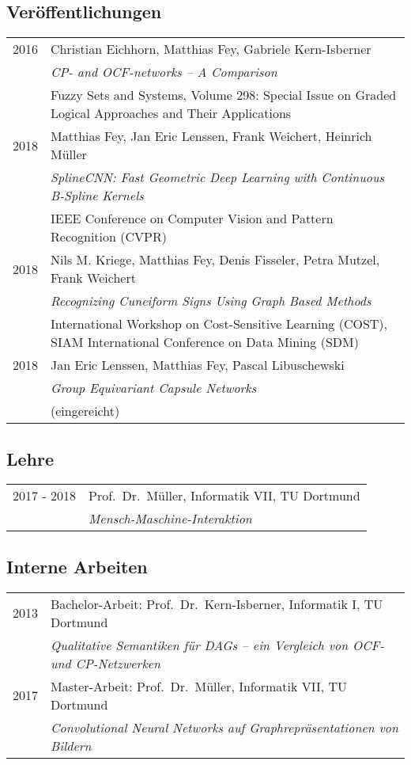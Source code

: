 \documentclass[10pt]{scrartcl}
\begin{document}
\subsection*{Veröffentlichungen}

\begin{tabular}{p{3cm}p{13cm}}
2016 & Christian Eichhorn, Matthias Fey, Gabriele Kern-Isberner\\
     & \textit{CP- and OCF-networks – A Comparison}\\
     & Fuzzy Sets and Systems, Volume 298: Special Issue on Graded Logical Approaches and Their Applications\\
2018 & Matthias Fey, Jan Eric Lenssen, Frank Weichert, Heinrich Müller\\
     & \textit{SplineCNN: Fast Geometric Deep Learning with Continuous B-Spline Kernels}\\
     & IEEE Conference on Computer Vision and Pattern Recognition (CVPR)\\
2018 & Nils M. Kriege, Matthias Fey, Denis Fisseler, Petra Mutzel, Frank Weichert\\
     & \textit{Recognizing Cuneiform Signs Using Graph Based Methods}\\
     & International Workshop on Cost-Sensitive Learning (COST), SIAM International Conference on Data Mining (SDM)\\
2018 & Jan Eric Lenssen, Matthias Fey, Pascal Libuschewski\\
     & \textit{Group Equivariant Capsule Networks}\\
     & (eingereicht)\\
\end{tabular}

\subsection*{Lehre}

\begin{tabular}{p{3cm}p{13cm}}
2017 - 2018 & Prof.~Dr.~Müller, Informatik VII, TU Dortmund\\
            & \textit{Mensch-Maschine-Interaktion}\\
\end{tabular}

\subsection*{Interne Arbeiten}

\begin{tabular}{p{3cm}p{13cm}}
2013 & Bachelor-Arbeit: Prof.~Dr.~Kern-Isberner, Informatik I, TU Dortmund\\
     & \textit{Qualitative Semantiken für DAGs – ein Vergleich von OCF- und CP-Netzwerken}\\
2017 & Master-Arbeit: Prof.~Dr.~Müller, Informatik VII, TU Dortmund\\
     & \textit{Convolutional Neural Networks auf Graphrepräsentationen von Bildern}\\
\end{tabular}
\end{document}
